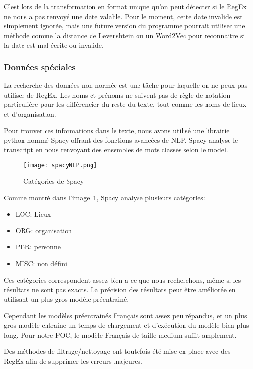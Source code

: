 C'est lors de la transformation en format unique qu'on peut détecter si le RegEx ne nous a pas renvoyé une date valable.
Pour le moment, cette date invalide est simplement ignorée, mais une future version du programme pourrait utiliser une méthode comme la distance de Levenshtein ou un Word2Vec pour reconnaitre si la date est mal écrite ou invalide.




\subsubsection{Données spéciales}
La recherche des données non normée est une tâche pour laquelle on ne peux pas utiliser de RegEx.
Les noms et prénoms ne suivent pas de règle de notation particulière pour les différencier du reste du texte, tout comme les noms de lieux et d'organisation.


Pour trouver ces informations dans le texte, nous avons utilisé une librairie python nommé Spacy offrant des fonctions avancées de NLP\@.
Spacy analyse le transcript en nous renvoyant des ensembles de mots classés selon le model.


\begin{figure}[h!]
  \centering
  \texttt{[image: spacyNLP.png]}
	\caption[]{Catégories de Spacy}
	\label{fig:spacyNLP}
\end{figure}

Comme montré dans l'image~\ref{fig:spacyNLP}, Spacy analyse plusieurs catégories:
\begin{itemize}
\item LOC\@: Lieux
\item ORG\@: organisation
\item PER\@: personne
\item MISC\@: non défini
\end{itemize}

Ces catégories correspondent assez bien a ce que nous recherchons, même si les résultats ne sont pas exacts.
La précision des résultats peut être améliorée en utilisant un plus gros modèle préentrainé.

Cependant les modèles préentrainés Français sont assez peu répandus, et un plus gros modèle entraine un temps de chargement et d'exécution du modèle bien plus long.
Pour notre POC, le modèle Français de taille medium suffit amplement.

Des méthodes de filtrage/nettoyage ont toutefois été mise en place avec des RegEx afin de supprimer les erreurs majeures.

